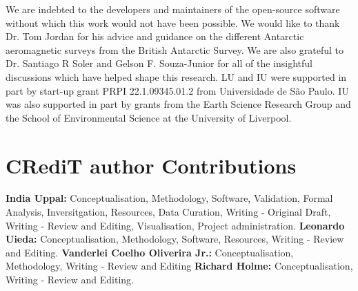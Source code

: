 We are indebted to the developers and maintainers of the open-source software without which this work would not have been possible. We would like to thank Dr. Tom Jordan for his advice and guidance on the different Antarctic aeromagnetic surveys from the British Antarctic Survey. We are also grateful to Dr. Santiago R Soler and Gelson F. Souza-Junior for all of the insightful discussions which have helped shape this research. LU and IU were supported in part by start-up grant PRPI 22.1.09345.01.2 from Universidade de São Paulo. IU was also supported in part by grants from the Earth Science Research Group and the School of Environmental Science at the University of Liverpool.

\section{CRediT author Contributions}

\textbf{India Uppal:} Conceptualisation, Methodology, Software, Validation, Formal Analysis, Inversitgation, Resources, Data Curation, Writing - Original Draft, Writing - Review and Editing, Visualisation, Project administration.
\textbf{Leonardo Uieda:} Conceptualisation, Methodology, Software, Resources, Writing - Review and Editing.
\textbf{Vanderlei Coelho Oliverira Jr.:} Conceptualisation, Methodology, Writing - Review and Editing
\textbf{Richard Holme:} Conceptualisation, Writing - Review and Editing.